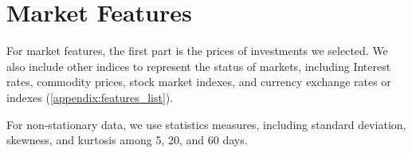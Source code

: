 \section{Market Features}
For market features, the first part is the prices of investments we selected. We also include other indices to represent the status of markets, including Interest rates, commodity prices, stock market indexes, and currency exchange rates or indexes (\autoref{appendix:features_list}).
\par
For non-stationary data, we use statistics measures, including standard deviation, skewness, and kurtosis among 5, 20, and 60 days.
